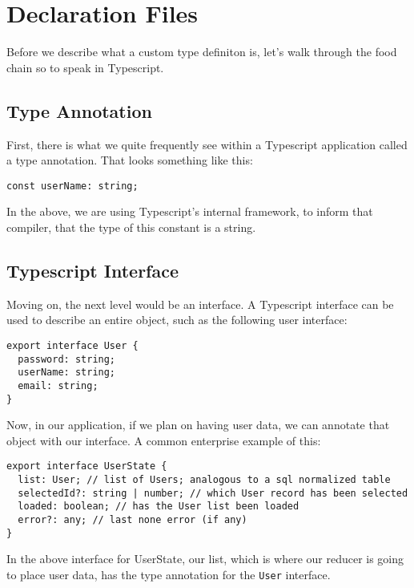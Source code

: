 \chapter{ Declaration Files }
Before we describe what a custom type definiton is, let's walk through the food chain so to speak in Typescript. 

\section{Type Annotation}
First, there is what we quite frequently see within a Typescript application called a type annotation. That looks something like this: 
\begin{verbatim}
const userName: string;  
\end{verbatim}

In the above, we are using Typescript's internal framework, to inform that compiler, that the type of this constant is a string. 

\section{Typescript Interface}
Moving on, the next level would be an interface. A Typescript interface can be used to describe an entire object, such as the following user interface: 
\begin{lstlisting}[caption=Typescript User Interface]
export interface User {
  password: string;
  userName: string;
  email: string;
}
\end{lstlisting}

Now, in our application, if we plan on having user data, we can annotate that object with our interface. A common enterprise example of this: 
\begin{lstlisting}[caption=user.reducer.ts]
export interface UserState {
  list: User; // list of Users; analogous to a sql normalized table
  selectedId?: string | number; // which User record has been selected
  loaded: boolean; // has the User list been loaded
  error?: any; // last none error (if any)
}  
\end{lstlisting}

In the above interface for UserState, our list, which is where our reducer is going to place user data, has the type annotation for the \lstinline{User} interface.



